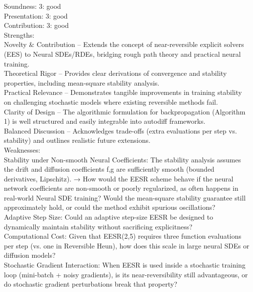 \documentclass{article}
\begin{document}
Soundness: 3: good\\
Presentation: 3: good\\
Contribution: 3: good\\
Strengths:\\
Novelty \& Contribution – Extends the concept of near-reversible explicit solvers (EES) to Neural SDEs/RDEs, bridging rough path theory and practical neural training.\\

Theoretical Rigor – Provides clear derivations of convergence and stability properties, including mean-square stability analysis.\\

Practical Relevance – Demonstrates tangible improvements in training stability on challenging stochastic models where existing reversible methods fail.\\

Clarity of Design – The algorithmic formulation for backpropagation (Algorithm 1) is well structured and easily integrable into autodiff frameworks.\\

Balanced Discussion – Acknowledges trade-offs (extra evaluations per step vs. stability) and outlines realistic future extensions.\\

Weaknesses:\\
Stability under Non-smooth Neural Coefficients: The stability analysis assumes the drift and diffusion coefficients f,g are sufficiently smooth (bounded derivatives, Lipschitz). → How would the EESR scheme behave if the neural network coefficients are non-smooth or poorly regularized, as often happens in real-world Neural SDE training? Would the mean-square stability guarantee still approximately hold, or could the method exhibit spurious oscillations?\\

Adaptive Step Size: Could an adaptive step-size EESR be designed to dynamically maintain stability without sacrificing explicitness?\\

Computational Cost: Given that EESR(2,5) requires three function evaluations per step (vs. one in Reversible Heun), how does this scale in large neural SDEs or diffusion models?\\

Stochastic Gradient Interaction: When EESR is used inside a stochastic training loop (mini-batch + noisy gradients), is its near-reversibility still advantageous, or do stochastic gradient perturbations break that property?\\
\end{document}
